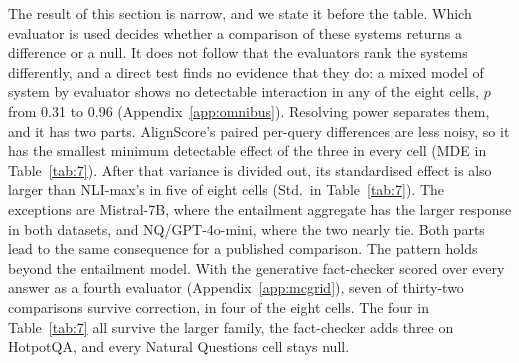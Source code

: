 \documentclass[11pt]{article}
\begin{document}
The result of this section is narrow, and we state it before the table. Which evaluator is used decides whether a comparison of these systems returns a difference or a null. It does not follow that the evaluators rank the systems differently, and a direct test finds no evidence that they do: a mixed model of system by evaluator shows no detectable interaction in any of the eight cells, $p$ from 0.31 to 0.96 (Appendix~\ref{app:omnibus}). Resolving power separates them, and it has two parts. AlignScore's paired per-query differences are less noisy, so it has the smallest minimum detectable effect of the three in every cell (MDE in Table~\ref{tab:7}). After that variance is divided out, its standardised effect is also larger than NLI-max's in five of eight cells (Std.\ in Table~\ref{tab:7}). The exceptions are Mistral-7B, where the entailment aggregate has the larger response in both datasets, and NQ/GPT-4o-mini, where the two nearly tie. Both parts lead to the same consequence for a published comparison. The pattern holds beyond the entailment model. With the generative fact-checker scored over every answer as a fourth evaluator (Appendix~\ref{app:mcgrid}), seven of thirty-two comparisons survive correction, in four of the eight cells. The four in Table~\ref{tab:7} all survive the larger family, the fact-checker adds three on HotpotQA, and every Natural Questions cell stays null.
\end{document}
